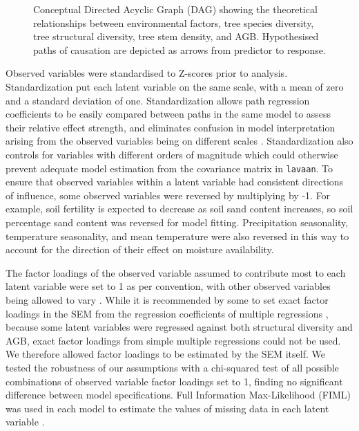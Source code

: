 \documentclass[11pt,a4paper]{article}
\begin{document}
\begin{figure}[H]
\centering
	
	\caption{Conceptual Directed Acyclic Graph (DAG) showing the theoretical relationships between environmental factors, tree species diversity, tree structural diversity, tree stem density, and AGB. Hypothesised paths of causation are depicted as arrows from predictor to response.}
	\label{con_mod}
\end{figure}

Observed variables were standardised to Z-scores prior to analysis. Standardization put each latent variable on the same scale, with a mean of zero and a standard deviation of one. Standardization allows path regression coefficients to be easily compared between paths in the same model to assess their relative effect strength, and eliminates confusion in model interpretation arising from the observed variables being on different scales \citep{Beaujean2014}. Standardization also controls for variables with different orders of magnitude which could otherwise prevent adequate model estimation from the covariance matrix in \verb|lavaan|. To ensure that observed variables within a latent variable had consistent directions of influence, some observed variables were reversed by multiplying by -1. For example, soil fertility is expected to decrease as soil sand content increases, so soil percentage sand content was reversed for model fitting. Precipitation seasonality, temperature seasonality, and mean temperature were also reversed in this way to account for the direction of their effect on moisture availability.

The factor loadings of the observed variable assumed to contribute most to each latent variable were set to 1 as per convention, with other observed variables being allowed to vary \citep{Beaujean2014}. While it is recommended by some to set exact factor loadings in the SEM from the regression coefficients of multiple regressions \citep{lavaan}, because some latent variables were regressed against both structural diversity and AGB, exact factor loadings from simple multiple regressions could not be used. We therefore allowed factor loadings to be estimated by the SEM itself. We tested the robustness of our assumptions with a chi-squared test of all possible combinations of observed variable factor loadings set to 1, finding no significant difference between model specifications. Full Information Max-Likelihood (FIML) was used in each model to estimate the values of missing data in each latent variable \citep{Cham2017}.
\end{document}
